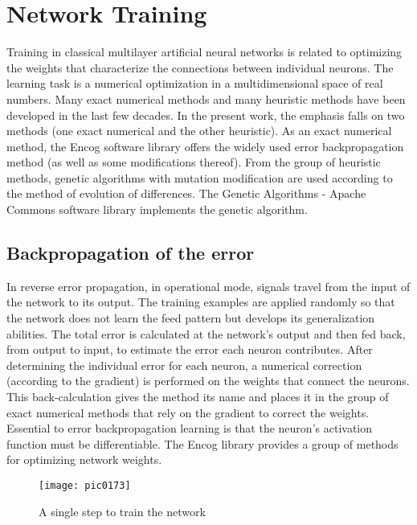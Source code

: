 \newpage
\chapter{Network Training}
\label{chapter07}

Training in classical multilayer artificial neural networks is related to optimizing the weights that characterize the connections between individual neurons. The learning task is a numerical optimization in a multidimensional space of real numbers. Many exact numerical methods and many heuristic methods have been developed in the last few decades. In the present work, the emphasis falls on two methods (one exact numerical and the other heuristic). As an exact numerical method, the Encog software library offers the widely used error backpropagation method (as well as some modifications thereof). From the group of heuristic methods, genetic algorithms with mutation modification are used according to the method of evolution of differences. The Genetic Algorithms - Apache Commons software library implements the genetic algorithm.

\section{Backpropagation of the error}

In reverse error propagation, in operational mode, signals travel from the input of the network to its output. The training examples are applied randomly so that the network does not learn the feed pattern but develops its generalization abilities. The total error is calculated at the network's output and then fed back, from output to input, to estimate the error each neuron contributes. After determining the individual error for each neuron, a numerical correction (according to the gradient) is performed on the weights that connect the neurons. This back-calculation gives the method its name and places it in the group of exact numerical methods that rely on the gradient to correct the weights. Essential to error backpropagation learning is that the neuron's activation function must be differentiable. The Encog library provides a group of methods for optimizing network weights.

\begin{figure}[h]
\centering
\texttt{[image: pic0173]}
\caption{A single step to train the network}
\label{fig:pic0173}
\end{figure}
\FloatBarrier

